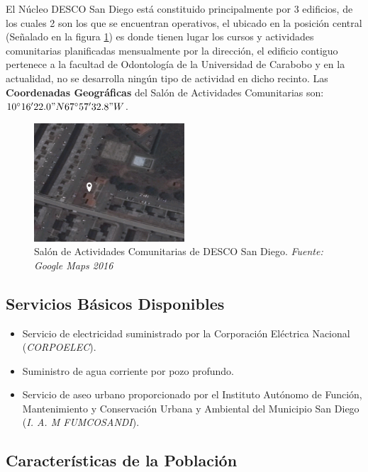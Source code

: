 \documentclass[11pt, a4paper, twosides]{report}
\begin{document}
El Núcleo DESCO San Diego está constituido principalmente por 3 edificios, de los cuales 2 son los que se encuentran operativos, el ubicado en la posición central (Señalado en la figura \ref{f2}) es donde tienen lugar los cursos y actividades comunitarias planificadas mensualmente por la dirección, el edificio contiguo pertenece a la facultad de Odontología de la Universidad de Carabobo y en la actualidad, no se desarrolla ningún tipo de actividad en dicho recinto. Las \textbf{Coordenadas Geográficas} del Salón de Actividades Comunitarias son: $10^{\circ}16'22.0"N 67^{\circ}57'32.8"W$.

\begin{figure}[h]
	\centering
	\includegraphics[width=0.5\textwidth]{fig2}
	\caption{Salón de Actividades Comunitarias de DESCO San Diego. \textit{Fuente: Google Maps 2016}}
	\label{f2}
\end{figure}
\subsection{Servicios Básicos Disponibles}
\begin{itemize}
	\item Servicio de electricidad suministrado por la Corporación Eléctrica Nacional (\textit{CORPOELEC}).
	\item Suministro de agua corriente por pozo profundo.
	\item Servicio de aseo urbano proporcionado por el Instituto Autónomo de Función, Mantenimiento y Conservación Urbana y Ambiental del Municipio San Diego (\textit{I. A. M FUMCOSANDI}).
\end{itemize}

\subsection{Características de la Población}
\end{document}
